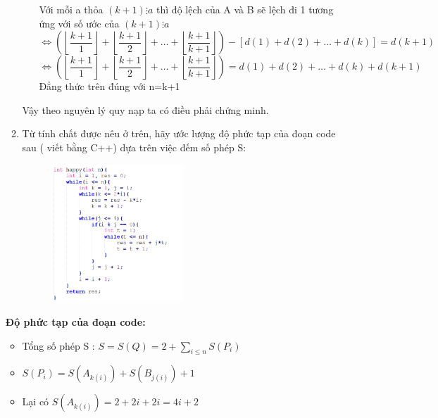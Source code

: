 \documentclass[12pt,a4paper]{article}
\begin{document}
\begin{enumerate}[label=\textbf{Câu 1:} ]
\begin{enumerate}[label=\alph*)]
\begin{itemize}[label=$\bullet$]
                              Với  mỗi  a thỏa  $(k+1)\vdots a $ thì độ lệch của  A và B sẽ lệch đi 1  tương ứng với số ước của $(k+1)\vdots a $
                              \[
                                  \Leftrightarrow\left( \left\lfloor \frac{k+1}{1} \right\rfloor + \left\lfloor \frac{k+1}{2} \right\rfloor + \ldots + \left\lfloor \frac{k+1}{k+1} \right\rfloor \right) - [d(1) + d(2) + \ldots + d(k)] = d(k+1)
                              \]
\[
                                  \Leftrightarrow\left( \left\lfloor \frac{k+1}{1} \right\rfloor + \left\lfloor \frac{k+1}{2} \right\rfloor + \ldots + \left\lfloor \frac{k+1}{k+1} \right\rfloor \right) = d(1) + d(2) + \ldots + d(k) + d(k+1)
                              \]
Đẳng thức trên đúng với n=k+1

                    \end{itemize}
                    Vậy theo nguyên lý quy nạp ta có điều phải chứng minh.
              \item Từ tính chất được nêu ở trên, hãy ước lượng độ phức tạp của đoạn code sau ( viết  bằng C++) dựa trên việc đếm số phép S:
                    \begin{figure}[h] %
                        \centering
                        \includegraphics[width=0.5\textwidth]{image/img1.png} %
                        \label{fig:hinh_anh}
                    \end{figure}
          \end{enumerate}
          \textbf{Độ phức tạp của đoạn code:}
          \begin{itemize}[label=$\bullet$]
          \item Tổng số phép S : $S=S(Q)=2+\sum_{i \le n} S(P_i)$
          \item $S(P_i) = S(A_{k(i)}) + S(B_{j(i)}) + 1$
          \item Lại có $S(A_{k(i)}) =  2 + 2i + 2i = 4i + 2$

\end{itemize}
\end{enumerate}
\end{document}
